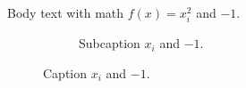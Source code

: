 \documentclass{article}
\begin{document}
Body text with math $f(x) = x_{i}^{2}$ and $-1$.

\begin{figure}[htbp]
  \centering
  \begin{subfigure}{0.45\linewidth}
    \caption{Subcaption $x_{i}$ and $-1$.}
  \end{subfigure}
  \caption{Caption $x_{i}$ and $-1$.}
\end{figure}
\end{document}
